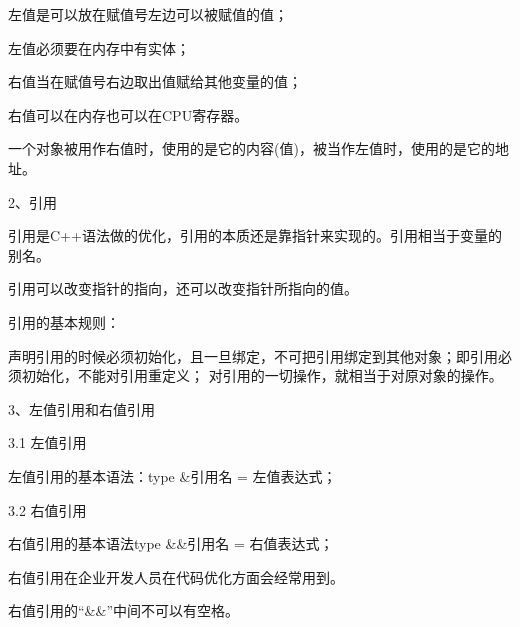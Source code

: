 左值是可以放在赋值号左边可以被赋值的值；

左值必须要在内存中有实体；

右值当在赋值号右边取出值赋给其他变量的值；

右值可以在内存也可以在CPU寄存器。

一个对象被用作右值时，使用的是它的内容(值)，被当作左值时，使用的是它的地址。

2、引用

引用是C++语法做的优化，引用的本质还是靠指针来实现的。引用相当于变量的别名。

引用可以改变指针的指向，还可以改变指针所指向的值。

引用的基本规则：

声明引用的时候必须初始化，且一旦绑定，不可把引用绑定到其他对象；即引用必须初始化，不能对引用重定义；
对引用的一切操作，就相当于对原对象的操作。

3、左值引用和右值引用

3.1 左值引用

左值引用的基本语法：type \&引用名 = 左值表达式；

3.2 右值引用

右值引用的基本语法type \&\&引用名 = 右值表达式；

右值引用在企业开发人员在代码优化方面会经常用到。

右值引用的“\&\&”中间不可以有空格。